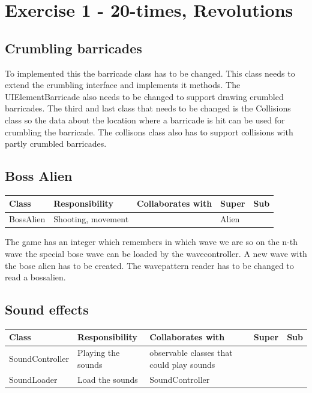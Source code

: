 \section{Exercise 1 - 20-times, Revolutions }
\subsection{Crumbling barricades }
To implemented this the barricade class has to be changed. This class needs to extend the crumbling interface and implements it methods. The UIElementBarricade also needs to be changed to support drawing crumbled barricades. The third and last class that needs to be changed is the Collisions class so the data about the location where a barricade is hit can be used for crumbling the barricade. The collisons class also has to support collisions with partly crumbled barricades.
\subsection{ Boss Alien}
\begin{center}
    \begin{tabular}{ | p{4.5cm} | p{3cm} | p{3cm} | p{3cm} | p{1cm} |}
  \hline
    Class & Responsibility & Collaborates with & Super & Sub \\ \hline
   BossAlien & Shooting, movement  &  & Alien & \\ \hline

    \end{tabular}
\end{center}
The game has an integer which remembers in which wave we are so on the n-th wave the special bose wave can be loaded by the wavecontroller. 
A new wave with the bose alien has to be created. The wavepattern reader has to be changed to read a bossalien.

\subsection{ Sound effects}
\begin{center}
    \begin{tabular}{ | p{4.5cm} | p{3cm} | p{3cm} | p{3cm} | p{1cm} |}
  \hline
    Class & Responsibility & Collaborates with & Super & Sub \\ \hline
   SoundController & Playing the sounds  & observable classes that could play sounds  &  & \\ \hline
   SoundLoader & Load the sounds  & SoundController  &  & \\ \hline

    \end{tabular}
\end{center}

